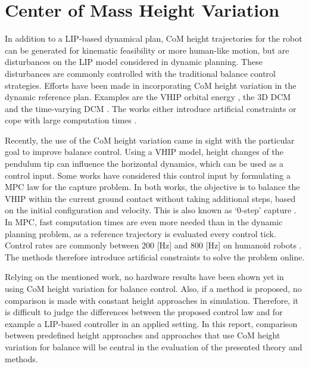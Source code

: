 \section{Center of Mass Height Variation}
In addition to a \ac{LIP}-based dynamical plan, \ac{CoM} height trajectories for the robot can be generated for kinematic feasibility or more human-like motion, but are disturbances on the \ac{LIP} model considered in dynamic planning. These disturbances are commonly controlled with the traditional balance control strategies. Efforts have been made in incorporating \ac{CoM} height variation in the dynamic reference plan. Examples are the \ac{VHIP} orbital energy \cite{pratt2007derivation}, the \ac{3D} \ac{DCM} \cite{englsberger2013three} and the time-varying \ac{DCM} \cite{hopkins2014humanoid}. The works either introduce artificial constraints \cite{pratt2007derivation} or cope with large computation times \cite{hopkins2014humanoid}.

Recently, the use of the \ac{CoM} height variation came in sight with the particular goal to improve balance control. Using a \ac{VHIP} model, height changes of the pendulum tip can influence the horizontal dynamics, which can be used as a control input. Some works have considered this control input by formulating a \ac{MPC} law \cite{koolen2016balance, caron2018balance} for the capture problem. In both works, the objective is to balance the \ac{VHIP} within the current ground contact without taking additional steps, based on the initial configuration and velocity. This is also known as `0-step' capture \cite{koolen2012capturability}. In \ac{MPC}, fast computation times are even more needed than in the dynamic planning problem, as a reference trajectory is evaluated every control tick. Control rates are commonly between $200$ [Hz] and $800$ [Hz] on humanoid robots \cite{koolen2016design, kuindersma2016optimization}. The methods therefore introduce artificial constraints to solve the problem online.

Relying on the mentioned work, no hardware results have been shown yet in using \ac{CoM} height variation for balance control. Also, if a method is proposed, no comparison is made with constant height approaches in simulation. Therefore, it is difficult to judge the differences between the proposed control law and for example a \ac{LIP}-based controller in an applied setting. In this report, comparison between predefined height approaches and approaches that use \ac{CoM} height variation for balance will be central in the evaluation of the presented theory and methods.


